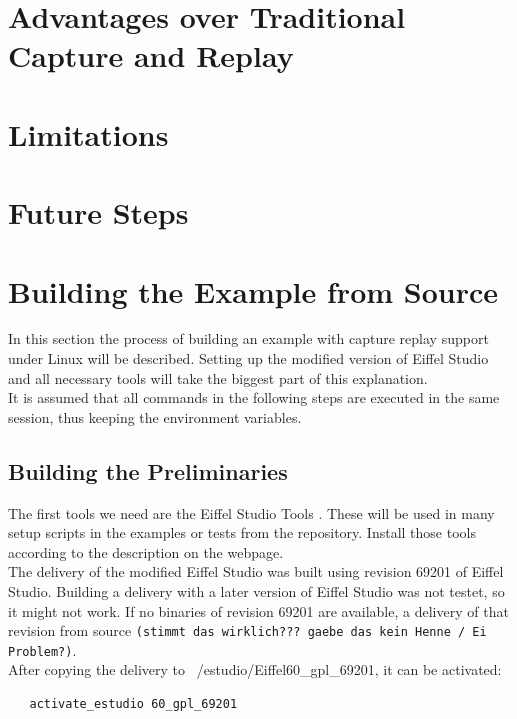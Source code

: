 

\section{Advantages over Traditional Capture and Replay}
\section{Limitations}
\section{Future Steps}

\section{Building the Example from Source}
In this section the process of building an example with capture replay support under Linux will be described. Setting up the modified version of Eiffel Studio and all necessary tools will take the biggest part of this explanation.\\
It is assumed that all commands in the following steps are executed in the same session, thus keeping the environment variables.\\

\subsection{Building the Preliminaries}
The first tools we need are the  Eiffel Studio Tools \cite{estudiotools}. These will be used in many setup scripts in the examples or tests from the repository. Install those tools according to the description on the webpage.\\

The delivery of the modified Eiffel Studio was built using revision 69201 of Eiffel Studio. Building a delivery with a later version of Eiffel Studio was not testet, so it might not work. If no binaries of revision 69201 are available, a delivery of that revision from source \texttt{(stimmt das wirklich??? gaebe das kein Henne / Ei Problem?)}.\\
After copying the delivery to ~/estudio/Eiffel60\_gpl\_69201, it can be activated:
\bashlisting
\begin{lstlisting}
   activate_estudio 60_gpl_69201
\end{lstlisting}

